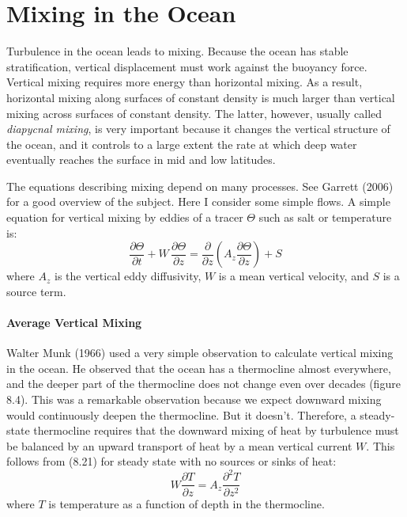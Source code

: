 \section{Mixing in the Ocean}
 Turbulence in the ocean leads to mixing. Because the ocean
has stable stratification, vertical displacement must work against the buoyancy
force. Vertical mixing requires more energy than horizontal mixing. As a result,
horizontal mixing along surfaces of constant density is much larger than vertical
mixing across surfaces of constant density. The latter, however, usually called
\textit{diapycnal mixing}, is very important because it changes the vertical structure of the
ocean, and it controls to a large extent the rate at which deep water eventually
reaches the surface in mid and low latitudes.

The equations describing mixing depend on many processes. See Garrett (2006) for a good overview of the subject. Here I consider some simple flows. A simple equation for vertical mixing by eddies of a tracer $\Theta$ such as salt or temperature is:
\begin{equation}
\frac{\partial \Theta}{\partial t} + W\,\frac{\partial \Theta}{\partial z} =
\frac{\partial }{\partial z} \left( A_z \frac{\partial \Theta}{\partial z}
\right) + S
\end{equation}
where $A_z$ is the vertical eddy diffusivity, $W$ is a mean vertical velocity,
and $S$ is a source term.

\paragraph{Average Vertical Mixing}
Walter Munk (1966) used a very simple observation to calculate
vertical mixing in the ocean. He observed that the ocean has a thermocline
almost everywhere, and the deeper part of the thermocline does not change
even over decades (figure 8.4). This was a remarkable observation because we expect downward
mixing would continuously deepen the thermocline. But it doesn't. Therefore, a steady-state
thermocline requires that the downward mixing of heat by turbulence
must be balanced by an upward transport of heat by a mean vertical
current $W$. This follows from (8.21) for steady state with no sources or sinks of heat:
\begin{equation}
W \frac{\partial T}{\partial z} = A_z \frac{\partial^2 T}{\partial z^2}
\end{equation}
where $T$ is temperature as a function of depth in the thermocline.

